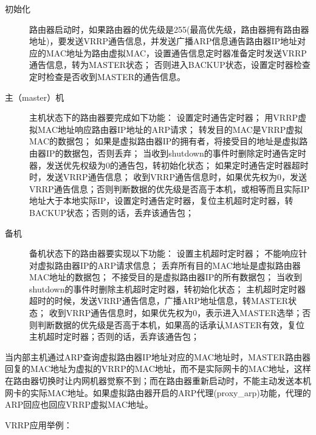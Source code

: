    \begin{description}
   \item[初始化]路由器启动时，如果路由器的优先级是255(最高优先级，路由器拥有路由器地址)，要发送VRRP通告信息，并发送广播ARP信息通告路由器IP地址对应的MAC地址为路由虚拟MAC，设置通告信息定时器准备定时发送VRRP通告信息，转为MASTER状态；
否则进入BACKUP状态，设置定时器检查定时检查是否收到MASTER的通告信息。
\item[主（master）机]主机状态下的路由器要完成如下功能：
 设置定时通告定时器；
 用VRRP虚拟MAC地址响应路由器IP地址的ARP请求；
 转发目的MAC是VRRP虚拟MAC的数据包；
 如果是虚拟路由器IP的拥有者，将接受目的地址是虚拟路由器IP的数据包，否则丢弃；
 当收到shutdown的事件时删除定时通告定时器，发送优先权级为0的通告包，转初始化状态；
 如果定时通告定时器超时时，发送VRRP通告信息；
 收到VRRP通告信息时，如果优先权为0，发送VRRP通告信息；否则判断数据的优先级是否高于本机，或相等而且实际IP地址大于本地实际IP，设置定时通告定时器，复位主机超时定时器，转BACKUP状态；否则的话，丢弃该通告包；
\item[备机] 备机状态下的路由器要实现以下功能：
 设置主机超时定时器；
 不能响应针对虚拟路由器IP的ARP请求信息；
 丢弃所有目的MAC地址是虚拟路由器MAC地址的数据包；
 不接受目的是虚拟路由器IP的所有数据包；
 当收到shutdown的事件时删除主机超时定时器，转初始化状态；
 主机超时定时器超时的时候，发送VRRP通告信息，广播ARP地址信息，转MASTER状态；
 收到VRRP通告信息时，如果优先权为0，表示进入MASTER选举；否则判断数据的优先级是否高于本机，如果高的话承认MASTER有效，复位主机超时定时器；否则的话，丢弃该通告包；
\end{description}


当内部主机通过ARP查询虚拟路由器IP地址对应的MAC地址时，MASTER路由器回复的MAC地址为虚拟的VRRP的MAC地址，而不是实际网卡的MAC地址，这样在路由器切换时让内网机器觉察不到；而在路由器重新启动时，不能主动发送本机网卡的实际MAC地址。如果虚拟路由器开启的ARP代理(proxy\_arp)功能，代理的ARP回应也回应VRRP虚拟MAC地址。

VRRP应用举例：\\

